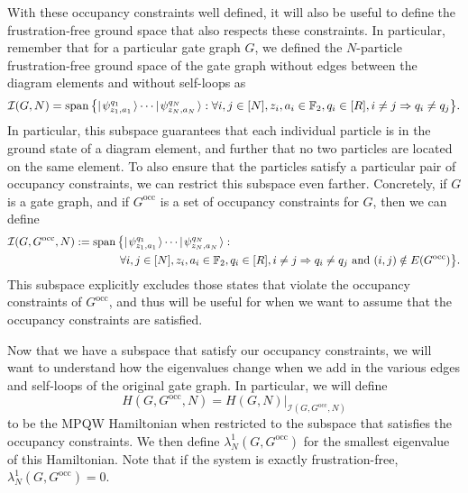 \documentclass[../thesis-main/thesis-main]{subfiles}
\begin{document}
With these occupancy constraints well defined, it will also be useful to define the frustration-free ground space that also respects these constraints.  In particular, remember that for a particular gate graph $G$, we defined the $N$-particle frustration-free ground space of the gate graph without edges between the diagram elements and without self-loops as
\begin{equation}
  \mathcal{I}(G,N) = \operatorname{span} \big\{ |\mspace{2mu} \psi_{z_1,a_1}^{q_1} \mspace{2mu} \rangle \cdots |\mspace{2mu} \psi_{z_N,a_N}^{q_N} \mspace{2mu} \rangle  :  \forall i,j\in [N], z_i,a_i\in \mathbb{F}_2, q_i\in [R], i\neq j \Rightarrow q_i\neq q_j\big\}.
\end{equation}
In particular, this subspace guarantees that each individual particle is in the ground state of a diagram element, and further that no two particles are located on the same element.  To also ensure that the particles satisfy a particular pair of occupancy constraints, we can restrict this subspace even farther. Concretely, if $G$ is a gate graph, and if $G^{\text{occ}}$ is a set of occupancy constraints for $G$, then we can define
\begin{align}
  \mathcal{I}(G,G^{\text{occ}},N) &:= \operatorname{span}\big\{ |\mspace{2mu} \psi_{z_1,a_1}^{q_1} \mspace{2mu} \rangle \cdots |\mspace{2mu} \psi_{z_N,a_N}^{q_N} \mspace{2mu} \rangle:\nonumber\\
  &\qquad\qquad  \forall i,j\in [N], z_i,a_i\in \mathbb{F}_2, q_i\in [R], i\neq j \Rightarrow q_i\neq q_j \text{ and } (i,j)\notin E(G^{\text{occ}})\big\}.\label{eq:I_Goc_n}
\end{align}
This subspace explicitly excludes those states that violate the occupancy constraints of $G^{\text{occ}}$, and thus will be useful for when we want to assume that the occupancy constraints are satisfied. 

Now that we have a subspace that satisfy our occupancy constraints, we will want to understand how the eigenvalues change when we add in the various edges and self-loops of the original gate graph.  In particular, we will define
\begin{equation}
  H(G,G^{\text{occ}},N) = H(G,N) \big |_{\mathcal{I}(G,G^{\text{occ}},N)}
\end{equation}
to be the MPQW Hamiltonian when restricted to the subspace that satisfies the occupancy constraints.  We then define $\lambda_N^1(G,G^{\text{occ}})$ for the smallest eigenvalue of this Hamiltonian.  Note that if the system is exactly frustration-free, $\lambda_N^1(G,G^{\text{occ}}) = 0$.


\end{document}

